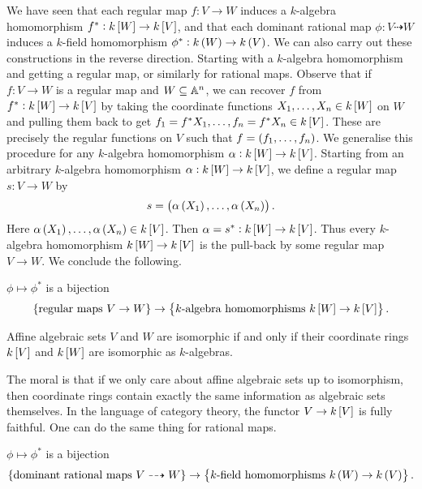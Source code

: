 We have seen that each regular map $ f : V \to W $ induces a $ k $-algebra homomorphism $ f^* : k\sbr{W} \to k\sbr{V} $, and that each dominant rational map $ \phi : V \dashrightarrow W $ induces a $ k $-field homomorphism $ \phi^* : k\br{W} \to k\br{V} $. We can also carry out these constructions in the reverse direction. Starting with a $ k $-algebra homomorphism and getting a regular map, or similarly for rational maps. Observe that if $ f : V \to W $ is a regular map and $ W \subseteq \AA^n $, we can recover $ f $ from $ f^* : k\sbr{W} \to k\sbr{V} $ by taking the coordinate functions $ X_1, \dots, X_n \in k\sbr{W} $ on $ W $ and pulling them back to get $ f_1 = f^*X_1, \dots, f_n = f^*X_n \in k\sbr{V} $. These are precisely the regular functions on $ V $ such that $ f = \br{f_1, \dots, f_n} $. We generalise this procedure for any $ k $-algebra homomorphism $ \alpha : k\sbr{W} \to k\sbr{V} $. Starting from an arbitrary $ k $-algebra homomorphism $ \alpha : k\sbr{W} \to k\sbr{V} $, we define a regular map $ s : V \to W $ by
$$ s = \br{\alpha\br{X_1}, \dots, \alpha\br{X_n}}. $$
Here $ \alpha\br{X_1}, \dots, \alpha\br{X_n} \in k\sbr{V} $. Then $ \alpha = s^* : k\sbr{W} \to k\sbr{V} $. Thus every $ k $-algebra homomorphism $ k\sbr{W} \to k\sbr{V} $ is the pull-back by some regular map $ V \to W $. We conclude the following.

\begin{proposition}
$ \phi \mapsto \phi^* $ is a bijection
$$ \cbr{\text{regular maps} \ V \to W} \to \cbr{\text{$ k $-algebra homomorphisms} \ k\sbr{W} \to k\sbr{V}}. $$
\end{proposition}

\begin{corollary}
Affine algebraic sets $ V $ and $ W $ are isomorphic if and only if their coordinate rings $ k\sbr{V} $ and $ k\sbr{W} $ are isomorphic as $ k $-algebras.
\end{corollary}

The moral is that if we only care about affine algebraic sets up to isomorphism, then coordinate rings contain exactly the same information as algebraic sets themselves. In the language of category theory, the functor $ V \to k\sbr{V} $ is fully faithful. One can do the same thing for rational maps.

\begin{proposition}
$ \phi \mapsto \phi^* $ is a bijection
$$ \cbr{\text{dominant rational maps} \ V \dashrightarrow W} \to \cbr{\text{$ k $-field homomorphisms} \ k\br{W} \to k\br{V}}. $$
\end{proposition}

